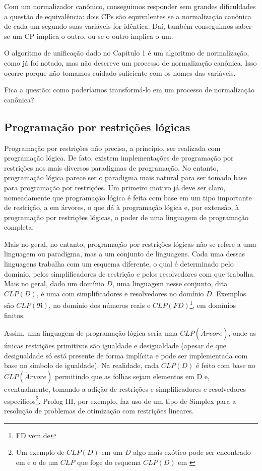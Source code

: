 Com um normalizador canônico, conseguimos responder sem grandes
dificuldades a questão de equivalência: dois CPs são equivalentes se
a normalização canônica de cada um segundo suas variáveis for
idêntica. Daí, também conseguimos saber se um CP implica o outro, ou
se o outro implica o um.

O algoritmo de unificação dado no Capítulo 1 %
é um algoritmo de normalização, como já foi notado, mas não descreve
um processo de normalização canônica. Isso ocorre porque não tomamos
cuidado suficiente com os nomes das variáveis.

Fica a questão: como poderíamos transformá-lo em um processo de
normalização canônica?

\subsection{Programação por restrições lógicas}

Programação por restrições não precisa, a princípio, ser realizada com
programação lógica. De fato, existem implementações de programação por
restrições nos mais diversos paradigmas de programação. No entanto,
programação lógica parece ser o paradigma mais natural para ser tomado
base para programação por restrições. Um primeiro motivo já deve ser
claro, nomeadamente que programação lógica é feita com base em um tipo
importante de restrição, a em árvores, o que dá à programação lógica
e, por extensão, à programação por restrições lógicas, o poder de uma
linguagem de programação completa.

Mais no geral, no entanto, programação por restrições lógicas não se
refere a uma linguagem ou paradigma, mas a um conjunto de
linguagens. Cada uma dessas linguagens trabalha com um esquema
diferente, o qual é determinado pelo domínio, pelos simplificadores de
restrição e pelos resolvedores com que trabalha. Mais no geral, dado
um domínio $D$, uma linguagem nesse conjunto, dita $CLP(D)$, é uma com
simplificadores e resolvedores no domínio $D$.  Exemplos são
$CLP(\Re)$, no domínio dos números reais e $CLP(FD)$\footnote{FD vem
  de }, em domínios finitos.

Assim, uma linguagem de programação lógica  seria
uma $CLP(\acute{A}rvore)$, onde as únicas restrições primitivas são
igualdade e desigualdade (apesar de que desigualdade só está presente
de forma implícita e pode ser implementada com base no símbolo de
igualdade).  Na realidade, cada $CLP(D)$ é feito com base no
$CLP(\acute{A}rvore)$ permitindo que as folhas sejam elementos em D e,
eventualmente, tomando a adição de restrições e simplificadores e
resolvedores específicos\footnote{Um exemplo de $CLP(D)$ em um $D$
  algo mais exótico pode ser encontrado em \cite{besik} e o de um
  $CLP$ que foge do esquema $CLP(D)$ em \cite{margarida}}. Prolog III,
por exemplo, faz uso de um tipo de Simplex para a resolução de
problemas de otimização com restrições lineares.



